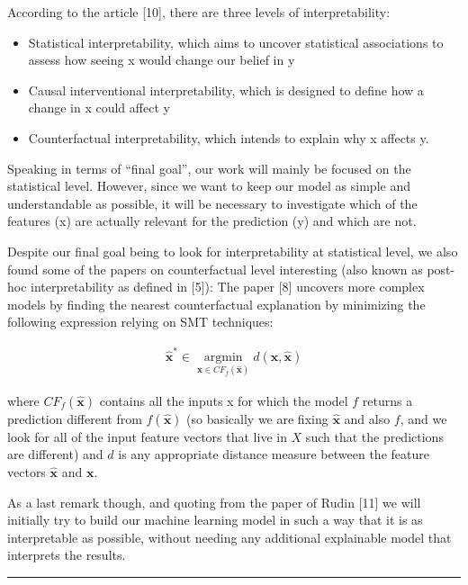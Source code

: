 \documentclass[
  12pt,
]{article}
\begin{document}
According to the article {[}10{]}, there are three levels of
interpretability:

\begin{itemize}
\item Statistical interpretability, which aims to uncover statistical associations to assess how seeing x would change our belief in y
\item Causal interventional interpretability, which is designed to define how a change in x could affect y
\item Counterfactual interpretability, which intends to explain why x affects y.
\end{itemize}

Speaking in terms of ``final goal'', our work will mainly be focused on
the statistical level. However, since we want to keep our model as
simple and understandable as possible, it will be necessary to
investigate which of the features (x) are actually relevant for the
prediction (y) and which are not.

Despite our final goal being to look for interpretability at statistical
level, we also found some of the papers on counterfactual level
interesting (also known as post-hoc interpretability as defined in
{[}5{]}): The paper {[}8{]} uncovers more complex models by finding the
nearest counterfactual explanation by minimizing the following
expression relying on SMT techniques:

\begin{align}
\hat{\boldsymbol{x}}^* \in \operatorname*{argmin}_{\boldsymbol{x} \in CF_f(\hat{\boldsymbol{x}})} d(\boldsymbol{x}, \hat{\boldsymbol{x}})
\end{align}

where \(CF_f(\hat{\boldsymbol{x}})\) contains all the inputs x for which
the model \(f\) returns a prediction different from
\(f(\hat{\boldsymbol{x}})\) (so basically we are fixing
\(\hat{\boldsymbol{x}}\) and also \(f\), and we look for all of the
input feature vectors that live in \(X\) such that the predictions are
different) and \(d\) is any appropriate distance measure between the
feature vectors \(\hat{\boldsymbol{x}}\) and \(\boldsymbol{x}\).

As a last remark though, and quoting from the paper of Rudin {[}11{]} we
will initially try to build our machine learning model in such a way
that it is as interpretable as possible, without needing any additional
explainable model that interprets the results.

\begin{center}\rule{0.5\linewidth}{0.5pt}\end{center}
\end{document}
